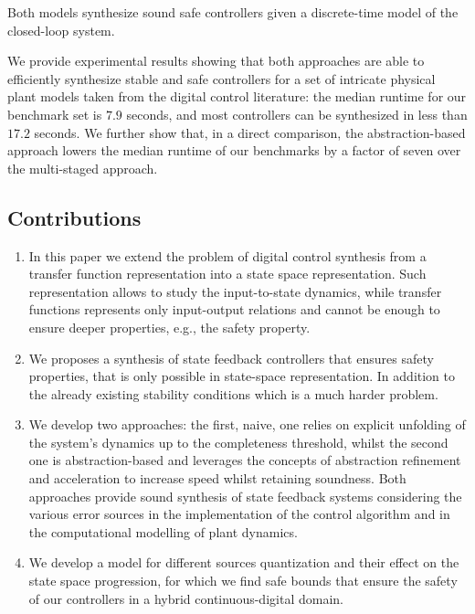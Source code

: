 \documentclass[runningheads,a4paper]{llncs}
\begin{document}
Both models synthesize sound safe controllers given a discrete-time model of the closed-loop system.

We provide experimental results 
showing that both approaches are able to efficiently synthesize stable and safe controllers 
for a set of intricate physical plant models taken from the digital 
control literature: the median runtime for our benchmark
set is $7.9$ seconds, and most controllers can be synthesized in less
than $17.2$ seconds. We further show that, in a direct comparison, the abstraction-based
approach lowers the median runtime of our benchmarks by a factor of seven over the
multi-staged approach.


\subsection*{Contributions} 

\begin{enumerate}
%
\item In this paper we extend the problem of digital control synthesis 
  from a transfer function representation into a state space representation. 
  Such representation allows to study the  input-to-state dynamics, while 
  transfer functions represents only input-output relations and cannot be 
  enough to ensure deeper properties, e.g., the safety property.
%
\item We proposes a synthesis of state feedback controllers that ensures 
  safety properties, that is only  possible in state-space representation. 
  In addition to the already existing stability conditions which is a much 
  harder problem.
%
\item We develop two approaches: the first, naive, one relies on
  explicit unfolding of the system's dynamics up to the completeness
  threshold, whilst the second one is abstraction-based and leverages
  the concepts of abstraction refinement and acceleration to increase 
  speed whilst retaining soundness. Both approaches provide sound
  synthesis of state feedback systems considering the various
  error sources in the implementation of the control algorithm and in the
  computational modelling of plant dynamics.
%
\item We develop a model for different sources quantization and their
  effect on the state space progression, for which we find safe bounds
  that ensure the safety of our controllers in a hybrid
  continuous-digital domain.
%
\end{enumerate}
\end{document}
